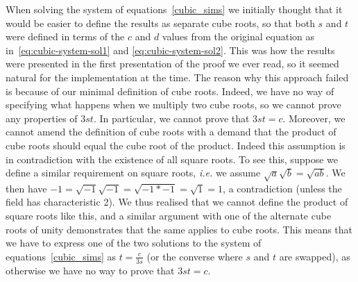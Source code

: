 \documentclass{article} %
\theoremstyle{plain}
\theoremstyle{definition}
\begin{document}
When solving the system of equations~\eqref{cubic_sims}
we initially thought that it would be easier to define the results as separate cube roots,
so that both $s$ and $t$ were defined in terms of the $c$ and $d$ values from the original equation as in~\eqref{eq:cubic-system-sol1} and \eqref{eq:cubic-system-sol2}.
This was how the results were presented in the first presentation of the proof we ever read,
so it seemed natural for the implementation at the time.
The reason why this approach failed is because of our minimal definition of cube roots. Indeed, we have no way of specifying what happens when we multiply two cube roots,
so we cannot prove any properties of $3st$. In particular, we cannot prove that $3st = c$.
Moreover, we cannot amend the definition of cube roots with a demand that the product of cube roots should equal the cube root of the product.
Indeed this assumption is in contradiction with the existence
of all square roots.
%
To see this, suppose we define a similar requirement on square roots, \textit{i.e.} we assume $\sqrt{a}\sqrt{b} = \sqrt{ab}$.
We then have
$-1 = \sqrt{-1}\sqrt{-1} = \sqrt{-1 * -1} = \sqrt{1} = 1$,
a contradiction (unless the field has characteristic 2).
We thus realised that we cannot define the product of square roots like this,
and a similar argument with one of the alternate cube roots of unity demonstrates that the same applies to cube roots.
This means that we have to express one of the two solutions
to the system of equations~\eqref{cubic_sims} as
$t = \frac{c}{3s}$ (or the converse where $s$ and $t$ are swapped),
as otherwise we have no way to prove that $3st = c$.
\end{document}
